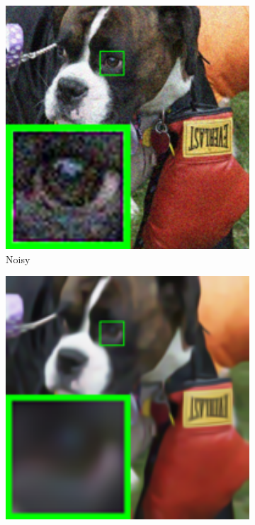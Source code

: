 \begin{figure}
    \centering
    \begin{subfigure}[t]{0.19\textwidth}
        \centering
        \includegraphics[width=1\textwidth]{images/guided/resize_br_Noisy_dog.png}
		\caption{Noisy}
    \end{subfigure}
    \hfill
    \begin{subfigure}[t]{0.19\textwidth}
        \centering
        \includegraphics[width=1\textwidth]{images/guided/resize_br_BM3DPoisson_dog.png}

\end{subfigure}
\end{figure}
